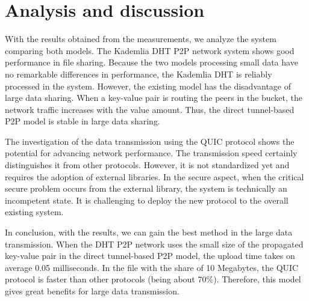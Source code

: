 \section{Analysis and discussion}

With the results obtained from the measurements, we analyze the system comparing both models. The Kademlia DHT P2P network system shows good performance in file sharing. Because the two models processing small data have no remarkable differences in performance, the Kademlia DHT is reliably processed in the system. However, the existing model has the disadvantage of large data sharing. When a key-value pair is routing the peers in the bucket, the network traffic increases with the value amount. Thus, the direct tunnel-based P2P model is stable in large data sharing.

The investigation of the data transmission using the QUIC protocol shows the potential for advancing network performance. The transmission speed certainly distinguishes it from other protocols. However, it is not standardized yet and requires the adoption of external libraries. In the secure aspect, when the critical secure problem occurs from the external library, the system is technically an incompetent state. It is challenging to deploy the new protocol to the overall existing system.

In conclusion, with the results, we can gain the best method in the large data transmission. When the DHT P2P network uses the small size of the propagated key-value pair in the direct tunnel-based P2P model, the upload time takes on average 0.05 milliseconds. In the file with the share of 10 Megabytes, the QUIC protocol is faster than other protocols (being about 70\%). Therefore, this model gives great benefits for large data transmission.

